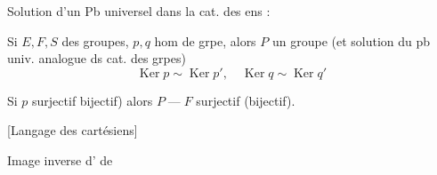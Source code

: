 
Solution d'un Pb universel dans la cat. des ens :

Si $E,F,S$ des groupes, $p,q$ hom de grpe, alors $P$ un groupe (et solution du pb univ. analogue ds cat. des grpes)
\[
\operatorname{Ker}p\sim\operatorname{Ker}p',\quad
\operatorname{Ker}q\sim\operatorname{Ker}q'
\]

Si $p$ surjectif \unsure{(}bijectif) alors $P\mathbin{\text{---}}F$ surjectif (bijectif).

[Langage des  cartésiens]

Image inverse d' de 

